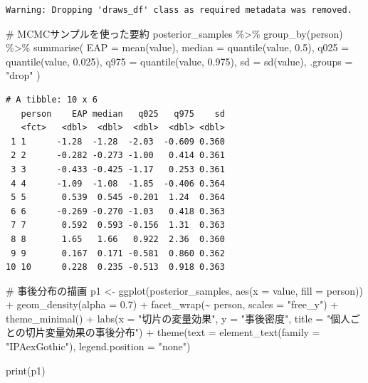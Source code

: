 \documentclass[
  a4paper,
]{ltjsbook}
\newenvironment{Shaded}{\begin{snugshade}}{\end{snugshade}}
\newcommand{\AttributeTok}[1]{\textcolor[rgb]{0.40,0.45,0.13}{#1}}
\newcommand{\CommentTok}[1]{\textcolor[rgb]{0.37,0.37,0.37}{#1}}
\newcommand{\FloatTok}[1]{\textcolor[rgb]{0.68,0.00,0.00}{#1}}
\newcommand{\FunctionTok}[1]{\textcolor[rgb]{0.28,0.35,0.67}{#1}}
\newcommand{\NormalTok}[1]{\textcolor[rgb]{0.00,0.23,0.31}{#1}}
\newcommand{\OtherTok}[1]{\textcolor[rgb]{0.00,0.23,0.31}{#1}}
\newcommand{\SpecialCharTok}[1]{\textcolor[rgb]{0.37,0.37,0.37}{#1}}
\newcommand{\StringTok}[1]{\textcolor[rgb]{0.13,0.47,0.30}{#1}}
\begin{document}
\begin{verbatim}
Warning: Dropping 'draws_df' class as required metadata was removed.
\end{verbatim}

\begin{Shaded}
\begin{Highlighting}[]
\CommentTok{\# MCMCサンプルを使った要約}
\NormalTok{posterior\_samples }\SpecialCharTok{\%\textgreater{}\%} 
  \FunctionTok{group\_by}\NormalTok{(person) }\SpecialCharTok{\%\textgreater{}\%} 
  \FunctionTok{summarise}\NormalTok{(}
    \AttributeTok{EAP =} \FunctionTok{mean}\NormalTok{(value),}
    \AttributeTok{median =} \FunctionTok{quantile}\NormalTok{(value, }\FloatTok{0.5}\NormalTok{),}
    \AttributeTok{q025 =} \FunctionTok{quantile}\NormalTok{(value, }\FloatTok{0.025}\NormalTok{),}
    \AttributeTok{q975 =} \FunctionTok{quantile}\NormalTok{(value, }\FloatTok{0.975}\NormalTok{),}
    \AttributeTok{sd =} \FunctionTok{sd}\NormalTok{(value),}
    \AttributeTok{.groups =} \StringTok{"drop"}
\NormalTok{  )}
\end{Highlighting}
\end{Shaded}

\begin{verbatim}
# A tibble: 10 x 6
   person    EAP median   q025   q975    sd
   <fct>   <dbl>  <dbl>  <dbl>  <dbl> <dbl>
 1 1      -1.28  -1.28  -2.03  -0.609 0.360
 2 2      -0.282 -0.273 -1.00   0.414 0.361
 3 3      -0.433 -0.425 -1.17   0.253 0.361
 4 4      -1.09  -1.08  -1.85  -0.406 0.364
 5 5       0.539  0.545 -0.201  1.24  0.364
 6 6      -0.269 -0.270 -1.03   0.418 0.363
 7 7       0.592  0.593 -0.156  1.31  0.363
 8 8       1.65   1.66   0.922  2.36  0.360
 9 9       0.167  0.171 -0.581  0.860 0.362
10 10      0.228  0.235 -0.513  0.918 0.363
\end{verbatim}

\begin{Shaded}
\begin{Highlighting}[]
\CommentTok{\# 事後分布の描画}
\NormalTok{p1 }\OtherTok{\textless{}{-}} \FunctionTok{ggplot}\NormalTok{(posterior\_samples, }\FunctionTok{aes}\NormalTok{(}\AttributeTok{x =}\NormalTok{ value, }\AttributeTok{fill =}\NormalTok{ person)) }\SpecialCharTok{+}
  \FunctionTok{geom\_density}\NormalTok{(}\AttributeTok{alpha =} \FloatTok{0.7}\NormalTok{) }\SpecialCharTok{+}
  \FunctionTok{facet\_wrap}\NormalTok{(}\SpecialCharTok{\textasciitilde{}}\NormalTok{ person, }\AttributeTok{scales =} \StringTok{"free\_y"}\NormalTok{) }\SpecialCharTok{+}
  \FunctionTok{theme\_minimal}\NormalTok{() }\SpecialCharTok{+}
  \FunctionTok{labs}\NormalTok{(}\AttributeTok{x =} \StringTok{"切片の変量効果"}\NormalTok{, }\AttributeTok{y =} \StringTok{"事後密度"}\NormalTok{, }\AttributeTok{title =} \StringTok{"個人ごとの切片変量効果の事後分布"}\NormalTok{) }\SpecialCharTok{+}
  \FunctionTok{theme}\NormalTok{(}\AttributeTok{text =} \FunctionTok{element\_text}\NormalTok{(}\AttributeTok{family =} \StringTok{"IPAexGothic"}\NormalTok{), }\AttributeTok{legend.position =} \StringTok{"none"}\NormalTok{)}

\FunctionTok{print}\NormalTok{(p1)}
\end{Highlighting}
\end{Shaded}
\end{document}
